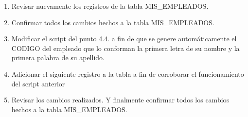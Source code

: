 \begin{enumerate}[1.]
	\item Revisar nuevamente los registros de la tabla MIS\_EMPLEADOS.
	\item Confirmar todos los cambios hechos a la tabla MIS\_EMPLEADOS.
	\item Modificar el script del punto 4.4. a fin de que se genere automáticamente el CODIGO del empleado que lo conforman la primera letra de su nombre y la primera palabra de su apellido.
	\item Adicionar el siguiente registro a la tabla a fin de corroborar el funcionamiento del script anterior
	\item Revisar los cambios realizados. Y finalmente confirmar todos los cambios hechos a la tabla MIS\_EMPLEADOS.

\end{enumerate} 
